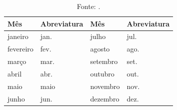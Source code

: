 \documentclass[diss,capa]{texufpel}
\begin{document}
\begin{table}[htbp]
  \caption{Abreviatura dos meses em português}
  \centering
  \begin{tabular}{llll}
    \hline
    Mês & Abreviatura & Mês & Abreviatura \\
    \hline
    janeiro   & jan.  & julho    & jul. \\
    fevereiro & fev.  & agosto   & ago. \\
    março     & mar.  & setembro & set. \\
    abril     & abr.  & outubro  & out. \\
    maio      & maio  & novembro & nov. \\
    junho     & jun.  & dezembro & dez. \\
    \hline
  \end{tabular}
  \caption*{Fonte: \citet{ABNT:2018:NBR6023}.}
\end{table}
\end{document}
